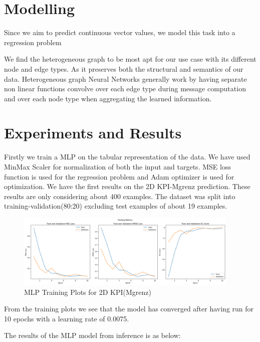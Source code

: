 \documentclass{report} %
\begin{document}
\newpage 

\chapter*{Modelling}
Since we aim to predict continuous vector values, we model this task into a regression problem

We find the heterogeneous graph to be most apt for our use case with its different node and edge types. As it preserves both the structural and semantics of our data.
Heterogeneous graph Neural Networks generally work by having separate non linear functions convolve over each edge type during message computation and over each node type when aggregating the learned information.

\newpage 

\chapter*{Experiments and Results}
Firstly we train a MLP on the tabular representation of the data.
We have used MinMax Scaler for normalization of both the input and targets.
MSE loss function is used for the regression problem and Adam optimizer is used for optimization.
We have the first results on the 2D KPI-Mgrenz prediction.
These results are only considering about 400 examples. The dataset was split into training-validation(80:20) excluding test examples of about 19 examples.
\begin{figure}[h]
    \centering
    \includegraphics[width=0.95\textwidth]{./ReportImages/mlp_training_kpi2d.png} 
    \caption{MLP Training Plots for 2D KPI(Mgrenz)} 
    \label{fig:MLP Training Plots for 2D KPI(Mgrenz)}
\end{figure}

From the training plots we see that the model has converged after having run for 10 epochs with a learning rate of 0.0075.

The results of the MLP model from inference is as below:
\end{document}
